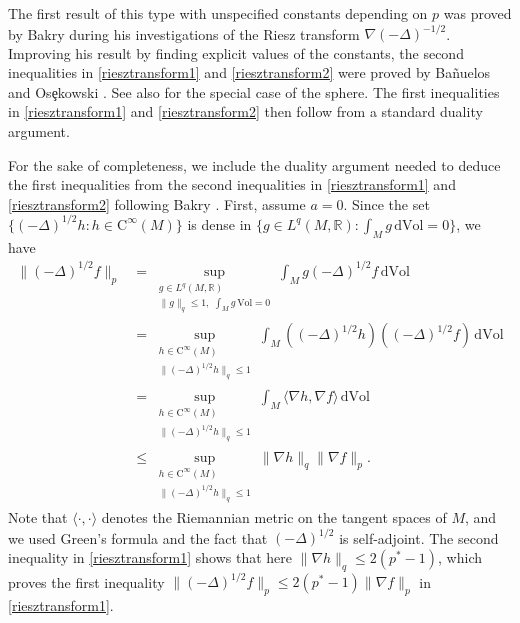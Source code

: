 \documentclass[11pt,a4paper]{article}
\theoremstyle{definition}
\begin{document}
The first result of this type with unspecified constants depending on $p$ was proved by Bakry \cite{BA} during his investigations of the Riesz transform $\nabla (-\Delta)^{-1/2}$. Improving his result by finding explicit values of the constants, the second inequalities in \eqref{riesztransform1} and \eqref{riesztransform2} were proved by Ba\~{n}uelos and Os\c{e}kowski \cite{BO}. See also \cite{AR} for the special case of the sphere. The first inequalities in \eqref{riesztransform1} and \eqref{riesztransform2} then follow from a standard duality argument.

For the sake of completeness, we include the duality argument needed to deduce the first inequalities from the second inequalities in \eqref{riesztransform1} and \eqref{riesztransform2} following Bakry \cite{BA}. First, assume $a=0$. Since the set $\{ (-\Delta)^{1/2} h : h \in \mathrm{C}^{\infty}(M) \}$ is dense in $\{ g \in L^q(M,\mathbb{R}) : \int_M g \, \mathrm{d}\mathrm{Vol}=0 \}$, we have
\[ \begin{split} \| (-\Delta)^{1/2} f \|_p &= \sup_{\substack{g \in L^q (M,\mathbb{R}) \\ \| g \|_q \le 1, \,\, \int_M g \, \mathrm{Vol}=0}} \int_M g (-\Delta)^{1/2} f \, \mathrm{d}\mathrm{Vol} \\ &= \sup_{\substack{h \in \mathrm{C}^{\infty} (M) \\ \| (-\Delta)^{1/2} h \|_q \le 1}} \int_M \left( (-\Delta)^{1/2} h \right) \left( (-\Delta)^{1/2} f \right) \, \mathrm{d} \mathrm{Vol} \\ &= \sup_{\substack{h \in \mathrm{C}^{\infty} (M) \\ \| (-\Delta)^{1/2} h \|_q \le 1}} \int_M \langle \nabla h, \nabla f \rangle \, \mathrm{d}\mathrm{Vol} \\ &\le \sup_{\substack{h \in \mathrm{C}^{\infty} (M) \\ \| (-\Delta)^{1/2} h \|_q \le 1}} \| \nabla h \|_q \| \nabla f \|_p . \end{split} \]
Note that $\langle \cdot, \cdot \rangle$ denotes the Riemannian metric on the tangent spaces of $M$, and we used Green's formula and the fact that $(-\Delta)^{1/2}$ is self-adjoint. The second inequality in \eqref{riesztransform1} shows that here $\| \nabla h \|_q \le 2(p^*-1)$, which proves the first inequality $\| (-\Delta)^{1/2} f \|_p \le 2(p^*-1) \| \nabla f \|_p$ in \eqref{riesztransform1}.
\end{document}

